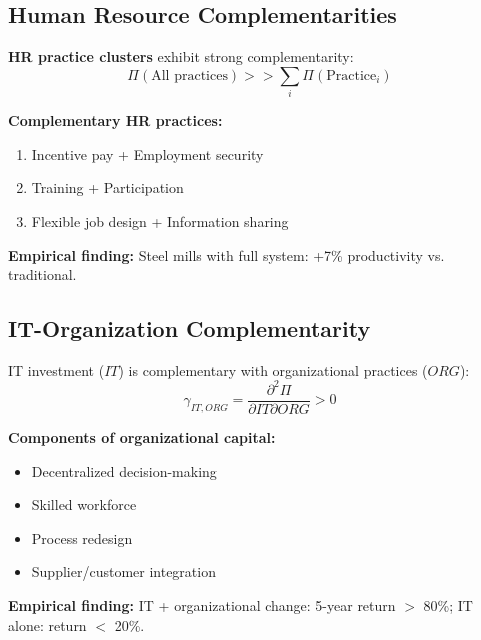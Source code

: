 \subsection{Human Resource Complementarities}

\begin{theorem}[Ichniowski et al., 1997]
\textbf{HR practice clusters} exhibit strong complementarity:
\begin{equation}
\Pi(\text{All practices}) >> \sum_i \Pi(\text{Practice}_i)
\end{equation}

\textbf{Complementary HR practices:}
\begin{enumerate}[noitemsep]
    \item Incentive pay + Employment security
    \item Training + Participation
    \item Flexible job design + Information sharing
\end{enumerate}

\textbf{Empirical finding:} Steel mills with full system: +7\% productivity vs. traditional.
\end{theorem}

\subsection{IT-Organization Complementarity}

\begin{tcolorbox}[colback=green!5!white,colframe=green!75!black,title=\textbf{Brynjolfsson \& Hitt (2000): IT and Organizational Capital}]
IT investment ($IT$) is complementary with organizational practices ($ORG$):
\begin{equation}
\gamma_{IT,ORG} = \frac{\partial^2 \Pi}{\partial IT \partial ORG} > 0
\end{equation}

\textbf{Components of organizational capital:}
\begin{itemize}[noitemsep]
    \item Decentralized decision-making
    \item Skilled workforce
    \item Process redesign
    \item Supplier/customer integration
\end{itemize}

\textbf{Empirical finding:} IT + organizational change: 5-year return $>$ 80\%; IT alone: return $<$ 20\%.
\end{tcolorbox}

